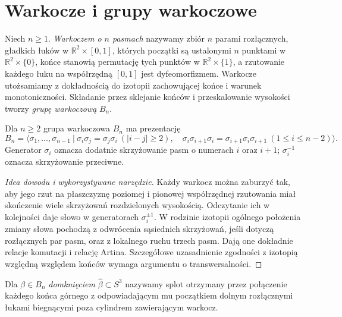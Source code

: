 \section{Warkocze i grupy warkoczowe}
\label{sec:kt-warkocze}

\begin{definicja}
Niech $n\geq1$. \emph{Warkoczem o $n$ pasmach} nazywamy
zbiór $n$ parami rozłącznych, gładkich łuków w
$\mathbb R^2\times[0,1]$, których początki są ustalonymi
$n$ punktami w $\mathbb R^2\times\{0\}$, końce stanowią
permutację tych punktów w $\mathbb R^2\times\{1\}$,
a rzutowanie każdego łuku na współrzędną $[0,1]$
jest dyfeomorfizmem. Warkocze utożsamiamy z dokładnością
do izotopii zachowującej końce i warunek monotoniczności.
Składanie przez sklejanie końców i przeskalowanie wysokości
tworzy \emph{grupę warkoczową} $B_n$.
\end{definicja}

\begin{twierdzenie}
Dla $n\geq2$ grupa warkoczowa $B_n$ ma prezentację
\[
B_n=\Big\langle\sigma_1,\ldots,\sigma_{n-1}\ \Big|\ 
\sigma_i\sigma_j=\sigma_j\sigma_i\ (|i-j|\geq2),\quad
\sigma_i\sigma_{i+1}\sigma_i=\sigma_{i+1}\sigma_i\sigma_{i+1}
\ (1\leq i\leq n-2)\Big\rangle.
\]
Generator $\sigma_i$ oznacza dodatnie skrzyżowanie pasm
o numerach $i$ oraz $i+1$; $\sigma_i^{-1}$ oznacza
skrzyżowanie przeciwne.
\end{twierdzenie}

\begin{proof}[Idea dowodu i wykorzystywane narzędzie]
Każdy warkocz można zaburzyć tak, aby jego rzut na płaszczyznę
poziomej i pionowej współrzędnej rzutowania miał skończenie wiele
skrzyżowań rozdzielonych wysokością. Odczytanie ich w kolejności
daje słowo w generatorach $\sigma_i^{\pm1}$.
W rodzinie izotopii ogólnego położenia zmiany słowa pochodzą
z odwrócenia sąsiednich skrzyżowań, jeśli dotyczą rozłącznych
par pasm, oraz z lokalnego ruchu trzech pasm. Dają one
dokładnie relacje komutacji i relację Artina. Szczegółowe
uzasadnienie zgodności z izotopią względną względem końców
wymaga argumentu o transwersalności.
\end{proof}

\begin{definicja}
Dla $\beta\in B_n$ \emph{domknięciem} $\widehat\beta\subset S^3$
nazywamy splot otrzymany przez połączenie każdego końca
górnego z odpowiadającym mu początkiem dolnym rozłącznymi
łukami biegnącymi poza cylindrem zawierającym warkocz.
\end{definicja}

